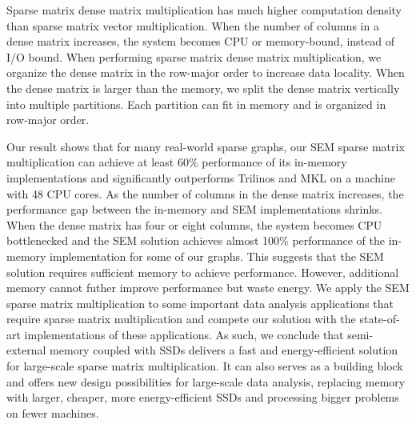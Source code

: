 Sparse matrix dense matrix multiplication has much higher computation density
than sparse matrix vector multiplication. When the number of columns in
a dense matrix increases, the system becomes CPU or memory-bound, instead of
I/O bound.
When performing sparse matrix dense matrix multiplication, we organize
the dense matrix in the row-major order to increase data locality.
When the dense matrix is larger than the memory, we split the dense matrix
vertically into multiple partitions. Each partition can fit in memory and
is organized in row-major order.


Our result shows that for many real-world sparse graphs, our SEM sparse matrix
multiplication can achieve at least 60\% performance of its in-memory
implementations and significantly outperforms Trilinos \cite{trilinos} and
MKL \cite{mkl} on a machine with 48 CPU cores. As the number of columns in
the dense matrix increases, the performance gap between the in-memory and
SEM implementations shrinks. When the dense matrix has four or eight columns,
the system becomes CPU bottlenecked and the SEM solution achieves almost
100\% performance of the in-memory implementation for some of our graphs.
This suggests that the SEM solution requires sufficient memory to achieve
performance. However, additional memory cannot futher improve performance
but waste energy. We apply the SEM sparse matrix multiplication to some important
data analysis applications that require sparse matrix multiplication and compete
our solution with the state-of-art implementations of these applications.
 As such, we conclude that
semi-external memory coupled with SSDs delivers a fast and energy-efficient
solution for large-scale sparse matrix multiplication. It can also serves
as a building block and offers new design possibilities for large-scale
data analysis, replacing memory with larger, cheaper, more energy-efficient SSDs
and processing bigger problems on fewer machines.
